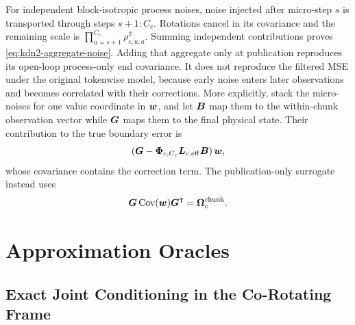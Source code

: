 \documentclass[11pt,letterpaper,logo]{yalearxiv}
\begin{document}
For independent block-isotropic process noises, noise injected after micro-step $s$ is transported
through steps $s+1{:}C_c$. Rotations cancel in its covariance and the remaining scale is
$\prod_{u=s+1}^{C_c}\rho_{c,u,a}^2$. Summing independent contributions proves
\eqref{eq:kdn2-aggregate-noise}. Adding that aggregate only at publication reproduces its
open-loop process-only end covariance. It does not reproduce the filtered MSE under the original
tokenwise model, because early noise enters later observations and becomes correlated with their
corrections.
More explicitly, stack the micro-noises for one value coordinate in $\boldsymbol{w}$, and let $\boldsymbol{B}$
map them to the within-chunk observation vector while $\boldsymbol{G}$ maps them to the final physical
state. Their contribution to the true boundary error is
\begin{equation}
  \left(
    \boldsymbol{G}
    -
    \boldsymbol{\Phi}_{c,C_c}\boldsymbol{L}_{c,\mathrm{eff}}\boldsymbol{B}
  \right)
  \boldsymbol{w},
\end{equation}
whose covariance contains the correction term. The publication-only surrogate instead uses
\begin{equation}
  \boldsymbol{G}\operatorname{Cov}(\boldsymbol{w})\boldsymbol{G}^{\intercal}
  =
  \boldsymbol{\Omega}_c^{\mathrm{chunk}}.
\end{equation}


\section{Approximation Oracles}
\label{app:kdn2-oracles}

\subsection{Exact Joint Conditioning in the Co-Rotating Frame}
\end{document}

